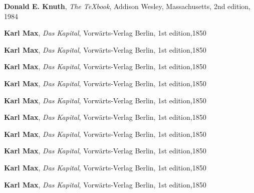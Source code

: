 \documentclass[12pt,ngerman,parskip=half]{scrartcl}
\begin{document}
\begin{thebibliography}{19}

\textbf{Donald E. Knuth}, \textit{The \TeX book}, Addison Wesley, Massachusetts, 2nd edition, 1984

\textbf{Karl Max}, \textit{Das Kapital}, Vorwärts-Verlag Berlin, 1st edition,1850

\textbf{Karl Max}, \textit{Das Kapital}, Vorwärts-Verlag Berlin, 1st edition,1850

\textbf{Karl Max}, \textit{Das Kapital}, Vorwärts-Verlag Berlin, 1st edition,1850

\textbf{Karl Max}, \textit{Das Kapital}, Vorwärts-Verlag Berlin, 1st edition,1850

\textbf{Karl Max}, \textit{Das Kapital}, Vorwärts-Verlag Berlin, 1st edition,1850

\textbf{Karl Max}, \textit{Das Kapital}, Vorwärts-Verlag Berlin, 1st edition,1850

\textbf{Karl Max}, \textit{Das Kapital}, Vorwärts-Verlag Berlin, 1st edition,1850

\textbf{Karl Max}, \textit{Das Kapital}, Vorwärts-Verlag Berlin, 1st edition,1850

\textbf{Karl Max}, \textit{Das Kapital}, Vorwärts-Verlag Berlin, 1st edition,1850

\textbf{Karl Max}, \textit{Das Kapital}, Vorwärts-Verlag Berlin, 1st edition,1850


\end{thebibliography}
\end{document}
